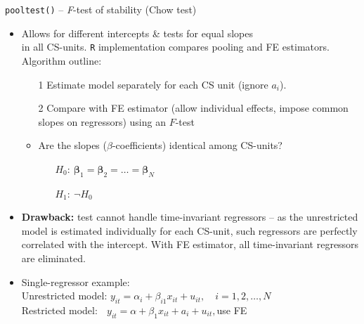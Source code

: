 \documentclass[usenames,dvipsnames]{beamer}
\begin{document}
\begin{frame}{\texttt{pooltest()} -- \textit{F}-test of stability (Chow test)}
\small 
\begin{itemize}
    \item Allows for different intercepts \& tests for equal slopes \\in all CS-units. \texttt{R} implementation compares pooling and FE estimators. Algorithm outline:
    \begin{itemize}
        \item[1] Estimate model separately for each CS unit (ignore $a_i$).
        \item[2] Compare with FE estimator (allow individual effects, impose common slopes on regressors) using an $F$-test 
        \item Are the slopes ($\beta$-coefficients) identical among CS-units?
        \begin{itemize}
    \item[] $H_0:~\bm{\beta}_{1}=\bm{\beta}_{2}=\dots=\bm{\beta}_{N}$  
    \item[] $H_1:~\neg H_0$
\end{itemize}
    \end{itemize}
    \smallskip
    \item \textbf{Drawback:} test cannot handle time-invariant regressors -- as the unrestricted model is estimated individually for each CS-unit, such regressors are perfectly correlated with the intercept. With FE estimator, all time-invariant regressors are eliminated. 
    \medskip
    \item Single-regressor example:\\ \medskip Unrestricted model: $y_{it} = \alpha_i + \beta_{i1} x_{it} + u_{it}, \quad i=1,2,\dots,N$\\ \smallskip Restricted model: $\,~~y_{it} = \alpha + \beta_1 x_{it} + a_i + u_{it},$\quad use FE
\end{itemize}
\end{frame}
\end{document}
